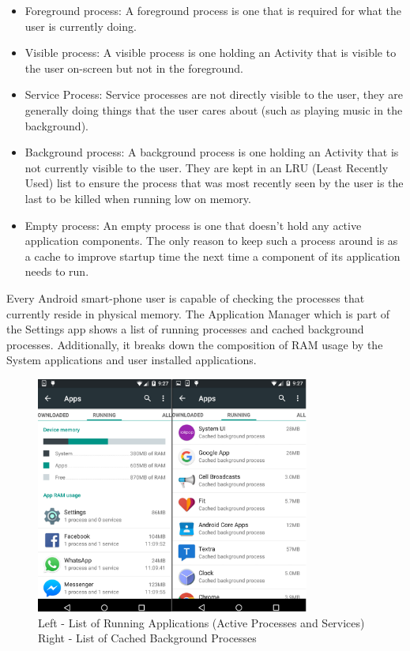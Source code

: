\documentclass[12pt]{uthesis-v12}  %
\begin{document}
			\begin{itemize}
				\item Foreground process: A foreground process is one that is required for what the user is currently doing.
				
				\item Visible process: A visible process is one holding an Activity that is visible to the user on-screen but not in the foreground.
				
				\item Service Process: Service processes are not directly visible to the user, they are generally doing things that the user cares about (such as playing music in the background). 
				
				\item Background process: A background process is one holding an Activity that is not currently visible to the user. They are kept in an LRU (Least Recently Used) list to ensure the process that was most recently seen by the user is the last to be killed when running low on memory.  
				
				\item Empty process: An empty process is one that doesn't hold any active application components. The only reason to keep such a process around is as a cache to improve startup time the next time a component of its application needs to run.				
			\end{itemize}
			
			Every Android smart-phone user is capable of checking the processes that currently reside in physical memory. The Application Manager which is part of the Settings app shows a list of running processes and cached background processes. Additionally, it breaks down the composition of RAM usage by the System applications and user installed applications. 
			
			\begin{figure}[h]
				\centering
				\includegraphics[width = 90mm]{images/runningApps.png}
				\caption[Running Apps and Cached Background Processes]
				{Left - List of Running Applications (Active Processes and Services)\\
					Right - List of Cached Background Processes}
			\end{figure}			
			 
\end{document}
